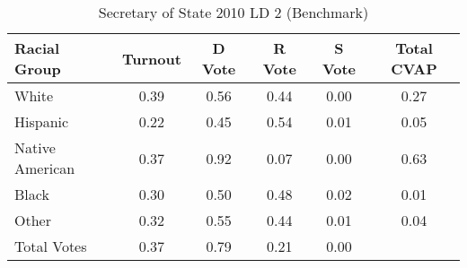 \begin{table}[htb]
\begin{center}
\caption{Secretary of State 2010 LD 2 (Benchmark)}
\label{sos10_cvap_ld_2_benchmark}
\begin{tabular}{lccccc}
  \hline
Racial Group & Turnout & D Vote & R Vote & S Vote & Total CVAP \\ 
  \hline
White & 0.39 & 0.56 & 0.44 & 0.00 & 0.27 \\ 
  Hispanic & 0.22 & 0.45 & 0.54 & 0.01 & 0.05 \\ 
  Native American & 0.37 & 0.92 & 0.07 & 0.00 & 0.63 \\ 
  Black & 0.30 & 0.50 & 0.48 & 0.02 & 0.01 \\ 
  Other & 0.32 & 0.55 & 0.44 & 0.01 & 0.04 \\ 
  Total Votes & 0.37 & 0.79 & 0.21 & 0.00 &  \\ 
   \hline
\end{tabular}
\end{center}
\end{table}
